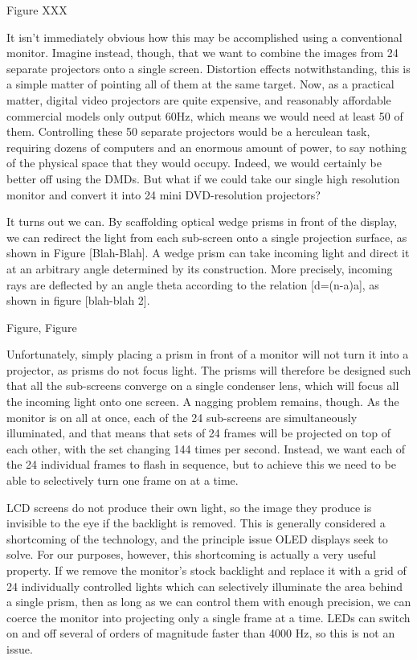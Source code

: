 \documentclass[12pt]{article}
\begin{document}
Figure XXX

It isn’t immediately obvious how this may be accomplished using a conventional monitor. Imagine instead, though, that we want to combine the images from 24 separate projectors onto a single screen. Distortion effects notwithstanding, this is a simple matter of pointing all of them at the same target. Now, as a practical matter, digital video projectors are quite expensive, and reasonably affordable commercial models only output 60Hz, which means we would need at least 50 of them. Controlling these 50 separate projectors would be a herculean task, requiring dozens of computers and an enormous amount of power, to say nothing of the physical space that they would occupy. Indeed, we would certainly be better off using the DMDs. But what if we could take our single high resolution monitor and convert it into 24 mini DVD-resolution projectors?

It turns out we can. By scaffolding optical wedge prisms in front of the display, we can redirect the light from each sub-screen onto a single projection surface, as shown in Figure [Blah-Blah]. A wedge prism can take incoming light and direct it at an arbitrary angle determined by its construction. More precisely, incoming rays are deflected by an angle theta according to the relation [d=(n-a)a], as shown in figure [blah-blah 2].

Figure, Figure

Unfortunately, simply placing a prism in front of a monitor will not turn it into a projector, as prisms do not focus light. The prisms will therefore be designed such that all the sub-screens converge on a single condenser lens, which will focus all the incoming light onto one screen. A nagging problem remains, though. As the monitor is on all at once, each of the 24 sub-screens are simultaneously illuminated, and that means that sets of 24 frames will be projected on top of each other, with the set changing 144 times per second. Instead, we want each of the 24 individual frames to flash in sequence, but to achieve this we need to be able to selectively turn one frame on at a time.

LCD screens do not produce their own light, so the image they produce is invisible to the eye if the backlight is removed.  This is generally considered a shortcoming of the technology, and the principle issue OLED displays seek to solve.  For our purposes, however, this shortcoming is actually a very useful property.  If we remove the monitor’s stock backlight and replace it with a grid of 24 individually controlled lights which can selectively illuminate the area behind a single prism, then as long as we can control them with enough precision, we can coerce the monitor into projecting only a single frame at a time.  LEDs can switch on and off several of orders of magnitude faster than 4000 Hz, so this is not an issue.
\end{document}
